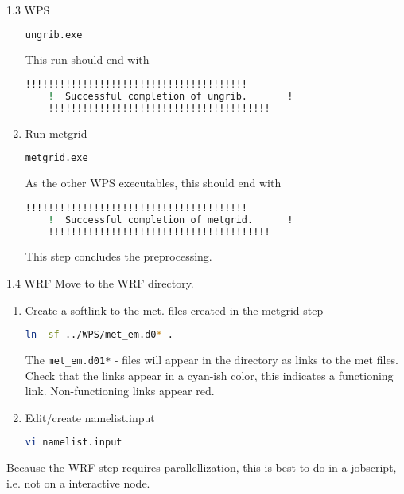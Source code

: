\documentclass[xcolor=table]{beamer}
\begin{document}
\begin{frame}[fragile, allowframebreaks=.95, t]{1.3 WPS}
\begin{enumerate}
\begin{lstlisting}[backgroundcolor = \color{light-gray}, language=bash]
	ungrib.exe
	\end{lstlisting}
	This run should end with
	\begin{lstlisting}[backgroundcolor = \color{light-gray}, language=bash]
	!!!!!!!!!!!!!!!!!!!!!!!!!!!!!!!!!!!!!!!
	!  Successful completion of ungrib.       !
	!!!!!!!!!!!!!!!!!!!!!!!!!!!!!!!!!!!!!!!
	\end{lstlisting}
	\item Run metgrid
	\begin{lstlisting}[backgroundcolor = \color{light-gray}, language=bash]
	metgrid.exe
	\end{lstlisting}
	As the other WPS executables, this should end with 
	\begin{lstlisting}[backgroundcolor = \color{light-gray}, language=bash]
	!!!!!!!!!!!!!!!!!!!!!!!!!!!!!!!!!!!!!!!
	!  Successful completion of metgrid.      !
	!!!!!!!!!!!!!!!!!!!!!!!!!!!!!!!!!!!!!!!
	\end{lstlisting}
	This step concludes the preprocessing.
\end{enumerate}
\end{frame}


\begin{frame}[fragile]{1.4 WRF}
Move to the WRF directory.
\begin{enumerate}
	\item Create a softlink to the met.-files created in the metgrid-step
	\begin{lstlisting}[backgroundcolor = \color{light-gray}, language=bash]
	ln -sf ../WPS/met_em.d0* .
	\end{lstlisting}
	The \texttt{met\_em.d01*} - files will appear in the directory as links to the met files. Check that the links appear in a cyan-ish color, this indicates a functioning link. Non-functioning links appear red. 
	\item Edit/create namelist.input
	\begin{lstlisting}[backgroundcolor = \color{light-gray}, language=bash]
	vi namelist.input
	\end{lstlisting}
\end{enumerate} 
Because the WRF-step requires parallellization, this is best to do in a jobscript, i.e. not on a interactive node. 
\end{frame}
\end{document}
